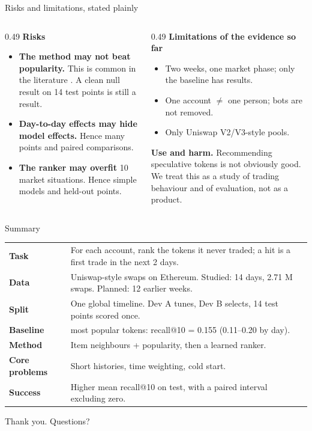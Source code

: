\documentclass[aspectratio=169,10pt]{beamer}
\begin{document}
\begin{frame}{Risks and limitations, stated plainly}
  \small
  \begin{columns}[T]
    \begin{column}{0.49\textwidth}
      \textbf{Risks}
      \begin{itemize}
        \item \textbf{The method may not beat popularity.} This is common in the literature \cite{li2021}. A clean null result on 14 test points is still a result.
        \item \textbf{Day-to-day effects may hide model effects.} Hence many points and paired comparisons.
        \item \textbf{The ranker may overfit} 10 market situations. Hence simple models and held-out points.
      \end{itemize}
    \end{column}
    \begin{column}{0.49\textwidth}
      \textbf{Limitations of the evidence so far}
      \begin{itemize}
        \item Two weeks, one market phase; only the baseline has results.
        \item One account $\neq$ one person; bots are not removed.
        \item Only Uniswap V2/V3-style pools.
      \end{itemize}
      \textbf{Use and harm.} Recommending speculative tokens is not obviously good. We treat this as a study of trading behaviour and of evaluation, not as a product.
    \end{column}
  \end{columns}
\end{frame}

\begin{frame}{Summary}
  \small
  \renewcommand{\arraystretch}{1.3}
  \begin{tabularx}{\textwidth}{@{}>{\bfseries}p{3.3cm}>{\raggedright\arraybackslash}X@{}}
    \toprule
    Task & For each account, rank the tokens it never traded; a hit is a first trade in the next 2 days. \\
    Data & Uniswap-style swaps on Ethereum. Studied: 14 days, 2.71 M swaps. Planned: 12 earlier weeks. \\
    Split & One global timeline. Dev A tunes, Dev B selects, 14 test points scored once. \\
    Baseline & 10 most popular tokens: recall@10 = 0.155 (0.11--0.20 by day). \\
    Method & Item neighbours + popularity, then a learned ranker. \\
    Core problems & Short histories, time weighting, cold start. \\
    Success & Higher mean recall@10 on test, with a paired interval excluding zero. \\
    \bottomrule
  \end{tabularx}
  \vspace{8pt}
  \begin{center}\Large\color{navy} Thank you. Questions?\end{center}
\end{frame}
\end{document}
